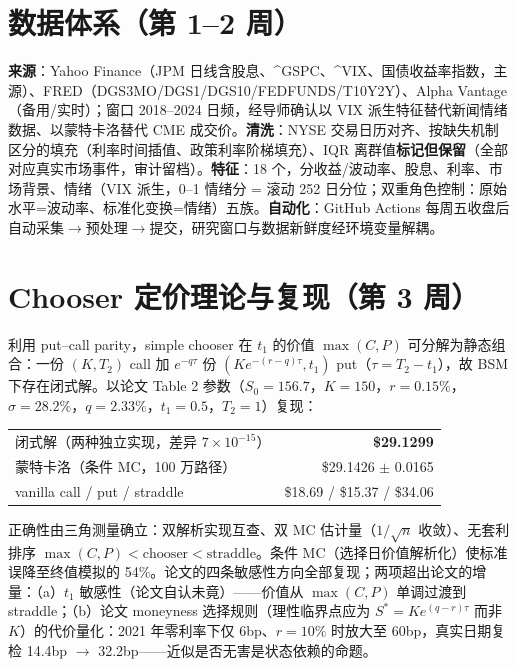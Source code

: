 \documentclass[11pt]{ctexart}
\begin{document}
\section{数据体系（第 1--2 周）}
\textbf{来源}：Yahoo Finance（JPM 日线含股息、\^{}GSPC、\^{}VIX、国债收益率指数，主源）、FRED（DGS3MO/DGS1/DGS10/FEDFUNDS/T10Y2Y）、Alpha Vantage（备用/实时）；窗口 2018--2024 日频，经导师确认以 VIX 派生特征替代新闻情绪数据、以蒙特卡洛替代 CME 成交价。\textbf{清洗}：NYSE 交易日历对齐、按缺失机制区分的填充（利率时间插值、政策利率阶梯填充）、IQR 离群值\textbf{标记但保留}（全部对应真实市场事件，审计留档）。\textbf{特征}：18 个，分收益/波动率、股息、利率、市场背景、情绪（VIX 派生，0--1 情绪分 = 滚动 252 日分位；双重角色控制：原始水平=波动率、标准化变换=情绪）五族。\textbf{自动化}：GitHub Actions 每周五收盘后自动采集$\to$预处理$\to$提交，研究窗口与数据新鲜度经环境变量解耦。

\section{Chooser 定价理论与复现（第 3 周）}
利用 put--call parity，simple chooser 在 $t_1$ 的价值 $\max(C,P)$ 可分解为静态组合：一份 $(K,T_2)$ call 加 $e^{-q\tau}$ 份 $(Ke^{-(r-q)\tau},t_1)$ put（$\tau=T_2-t_1$），故 BSM 下存在闭式解。以论文 Table 2 参数（$S_0=156.7$，$K=150$，$r=0.15\%$，$\sigma=28.2\%$，$q=2.33\%$，$t_1=0.5$，$T_2=1$）复现：

\begin{center}
\small
\begin{tabular}{lr}
\toprule
闭式解（两种独立实现，差异 $7\times10^{-15}$） & \textbf{\$29.1299} \\
蒙特卡洛（条件 MC，100 万路径） & \$29.1426 $\pm$ 0.0165 \\
vanilla call / put / straddle & \$18.69 / \$15.37 / \$34.06 \\
\bottomrule
\end{tabular}
\end{center}

正确性由三角测量确立：双解析实现互查、双 MC 估计量（$1/\sqrt{n}$ 收敛）、无套利排序 $\max(C,P)<\text{chooser}<\text{straddle}$。条件 MC（选择日价值解析化）使标准误降至终值模拟的 54\%。论文的四条敏感性方向全部复现；两项超出论文的增量：（a）$t_1$ 敏感性（论文自认未竟）——价值从 $\max(C,P)$ 单调过渡到 straddle；（b）论文 moneyness 选择规则（理性临界点应为 $S^*=Ke^{(q-r)\tau}$ 而非 $K$）的代价量化：2021 年零利率下仅 6bp、$r=10\%$ 时放大至 60bp，真实日期复检 14.4bp $\to$ 32.2bp——近似是否无害是状态依赖的命题。
\end{document}
